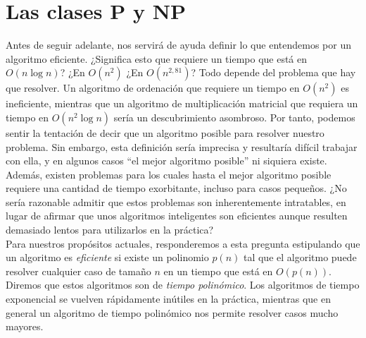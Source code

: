 \section{Las clases P y NP}

Antes de seguir adelante, nos servirá de ayuda definir lo que entendemos por un algoritmo eficiente. ¿Significa esto que requiere un tiempo que está en $O(n \log n)$? ¿En $O(n^2)$ ¿En $O(n^{2,81})$? Todo depende del problema que hay que resolver. Un algoritmo de ordenación que requiere un tiempo en $O(n^2)$ es ineficiente, mientras que un algoritmo de multiplicación matricial que requiera un tiempo en $O(n^2 \log n)$ sería un descubrimiento asombroso. Por tanto, podemos sentir la tentación de decir que un algoritmo posible para resolver nuestro problema. Sin embargo, esta definición sería imprecisa y resultaría difícil trabajar con ella, y en algunos casos ``el mejor algoritmo posible'' ni siquiera existe. Además, existen problemas para los cuales hasta el mejor algoritmo posible requiere una cantidad de tiempo exorbitante, incluso para casos pequeños. ¿No sería razonable admitir que estos problemas son inherentemente intratables, en lugar de afirmar que unos algoritmos inteligentes son eficientes aunque resulten demasiado lentos para utilizarlos en la práctica?\\

Para nuestros propósitos actuales, responderemos a esta pregunta estipulando que un algoritmo es \emph{eficiente} si existe un polinomio $p(n)$ tal que el algoritmo puede resolver cualquier caso de tamaño $n$ en un tiempo que está en $O(p(n))$. Diremos que estos algoritmos son de \emph{tiempo polinómico}. Los algoritmos de tiempo exponencial se vuelven rápidamente inútiles en la práctica, mientras que en general un algoritmo de tiempo polinómico nos permite resolver casos mucho mayores.\\

